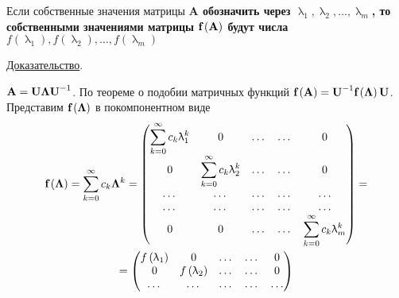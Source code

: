 \begin{theorem}
    Если собственные значения матрицы \bf{A} обозначить через $\uplambda_1, \uplambda_2, \dots, \uplambda_m$, то
    собственными значениями матрицы $\bf{f} \left( \bf{A} \right)$ будут числа $f(\uplambda_1), f(\uplambda_2), \dots, f(\uplambda_m)$

    \underline{Доказательство}.
    \vspace{5pt}

    $\bf{A} = \bf{U} \bm{\Lambda} \bf{U}^{-1}$. По теореме о подобии матричных функций $\displaystyle \bf{f} \left( \bf{A} \right) = \bf{U}^{-1} \bf{f} \left( \bm{\Lambda} \right) \bf{U}$.
    Представим $\bf{f} \left( \bm{\Lambda} \right)$ в покомпонентном виде
    \begin{gather*}
        \bf{f} \left( \bm{\Lambda} \right) = \sum_{k=0}^{\infty} c_k \bm{\Lambda}^k =
        \begin{pmatrix}
            \displaystyle
            \sum_{k=0}^{\infty} c_k \uplambda_1^k & 0                                                   & \dots & \dots & 0                                                   \\
            0                                     & \displaystyle \sum_{k=0}^{\infty} c_k \uplambda_2^k & \dots & \dots & 0                                                   \\
            \dots                                 & \dots                                               & \dots & \dots & \dots                                               \\
            \dots                                 & \dots                                               & \dots & \dots & \dots                                               \\
            0                                     & 0                                                   & \dots & \dots & \displaystyle \sum_{k=0}^{\infty} c_k \uplambda_m^k
        \end{pmatrix}
        = \\
        =\begin{pmatrix}
             f \left( \uplambda_1 \right) & 0                            & \dots & \dots & 0                            \\
             0                            & f \left( \uplambda_2 \right) & \dots & \dots & 0                            \\
             \dots                        & \dots                        & \dots & \dots & \dots                        \\

\end{pmatrix}
\end{gather*}
\end{theorem}

